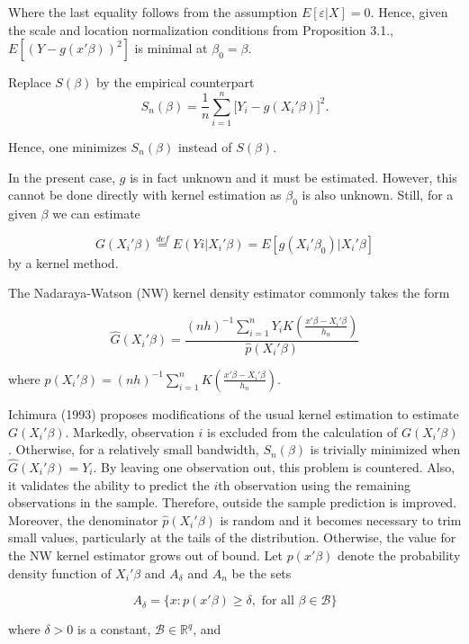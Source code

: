 \documentclass[a4paper]{article}
\begin{document}
Where the last equality follows from the assumption $E[\varepsilon|X]=0$. Hence, given the scale and location normalization conditions from Proposition 3.1., $E[(Y - g(x'\beta))^2]$ is minimal at $\beta_0 = \beta$.

Replace $S(\beta)$ by the empirical counterpart 
\begin{equation}
S_n(\beta) = \frac{1}{n}\sum_{i = 1}^n\big[Y_i - g(X_i'\beta)\big]^2.
\end{equation}

Hence, one minimizes $S_n(\beta)$ instead of $S(\beta)$.


In the present case, $g$ is in fact unknown and it must be estimated. However, this cannot be done directly with kernel estimation as $\beta_0$ is also unknown. Still, for a given $\beta$ we can estimate

\begin{equation}
G(X_i'\beta) \stackrel{def}{=} E(Yi|X_i'\beta) = E[g(X_i'\beta_0)|X_i'\beta]
\end{equation}
 by a kernel method. 

The Nadaraya-Watson (NW) kernel density estimator commonly takes the form

\[\hat{G}(X_i'\beta) = \frac{(nh)^{-1}\sum_{i=1}^{n}  Y_iK \left(\frac{x'\beta - X_i'\beta}{h_n}\right)}{\hat{p}(X_i'\beta)} \]

where $\hat{p}(X_i'\beta) = (nh)^{-1}\sum_{i=1}^{n}K\left(\frac{x'\beta - X_i'\beta}{h_n}\right)$.


Ichimura (1993) \cite{[6]} proposes modifications of the usual kernel estimation to estimate $G(X_i'\beta)$. Markedly, observation $i$ is excluded from the calculation of $G(X_i'\beta)$. Otherwise, for a relatively small bandwidth, $S_n(\beta)$ is trivially minimized when $\hat{G}(X_i'\beta) = Y_i$. By leaving one observation out, this problem is countered. Also, it validates the ability to predict the $i$th observation using the remaining observations in the sample. Therefore, outside the sample prediction is improved. Moreover, the denominator $\hat{p}(X_i'\beta)$ is random and it becomes necessary to trim small values, particularly at the tails of the distribution. Otherwise, the value for the NW kernel estimator grows out of bound. Let $p(x'\beta)$ denote the probability density function of $X_i'\beta$ and $A_\delta$ and $A_n$ be the sets

\[ A_\delta = \{ x : p(x'\beta) \geq \delta, \text{ for all }  \beta \in \mathcal{B} \}
\]

where $\delta > 0$ is a constant, $\mathcal{B} \in \mathbb{R}^q$, and
\end{document}
